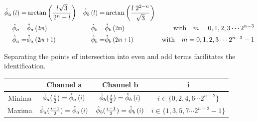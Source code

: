 \begin{align}\label{eq:ExtremaFunctions}
 \extremaTheta{a} {l}= & \arctan\left(\frac{l \sqrt{3} }{2^n - l}\right) &
 \extremaTheta{b} {l}= & \arctan\left(\frac{l \; 2^{2-n}}{\sqrt{3}}       \right) \\ 
 \minimaTheta{a} = & \extremaTheta{a} {2m} &
 \minimaTheta{b} = & \extremaTheta{b} {2m} 
 & \text{with}\quad   m =  0,1,2,3 \cdots2^{n-3} \\
  \maximaTheta{a} = & \extremaTheta{a} {2m+1} &
  \maximaTheta{b} = & \extremaTheta{b} {2m+1} 
 &\text{with}\quad   m =  0,1,2,3 \cdots2^{n-3}-1 
\end{align}


Separating the points of intersection into even and odd terms facilitates the identification. 

\begin{tabular}{|c|c|c|c|}
\hline
  & Channel a & Channel b &  i \\ 
\hline Minima  &  $ \minimaTheta{a}(\frac{i}{2})=\extremaTheta{a}{i} $ & $ \minimaTheta{b}(\frac{i}{2})=\extremaTheta{b}{i} $ & $ i \in \{0,2,4,6\cdots2^{n-2} \} $\\ 
\hline Maxima  &  $     \maximaTheta{a}(\frac{i-1}{2})=\extremaTheta{a}{i} $ & $     \maximaTheta{b}(\frac{i-1}{2})=\extremaTheta{b}{i} $ & $ i \in \{1,3,5,7\cdots2^{n-2}-1\}  $ \\ 
\hline 
\end{tabular} 


